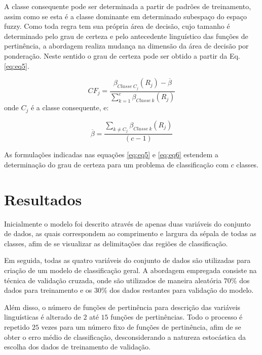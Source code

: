 \documentclass[12pt,a4paper]{article}
\numberwithin{equation}{section}
\begin{document}
A classe consequente pode ser determinada a partir de padrões de treinamento, assim como se esta é a classe dominante em determinado subespaço do espaço fuzzy. Como toda regra tem sua própria área de decisão, cujo tamanho é determinado pelo grau de certeza e pelo antecedente linguístico das funções de pertinência, a abordagem realiza mudança na dimensão da área de decisão por ponderação. Neste sentido o grau de certeza pode ser obtido a partir da Eq. \eqref{eq:eq5}.

\begin{equation} \label{eq:eq5}
CF_{j}=\frac{\beta_{Classe~C_{j}}(R_{j})-\overline{\beta}}{\sum_{k=1}^{c}\beta_{Classe~k}(R_{j})}
\end{equation}
onde $C_{j}$ é a classe consequente, e:

\begin{equation} \label{eq:eq6}
\overline{\beta}=\frac{\sum_{k\neq C_{j}}\beta_{Classe~k}(R_{j})}{(c-1)}
\end{equation}

As formulações indicadas nas equações \eqref{eq:eq5} e \eqref{eq:eq6} estendem a determinação do grau de certeza para um problema de classificação com $c$ classes.

\section{Resultados}

Inicialmente o modelo foi descrito através de apenas duas variáveis do conjunto de dados, as quais correspondem ao comprimento e largura da sépala de todas as classes, afim de se visualizar as delimitações das regiões de classificação.

Em seguida, todas as quatro variáveis do conjunto de dados são utilizadas para criação de um modelo de classificação geral. A abordagem empregada consiste na técnica de validação cruzada, onde são utilizados de maneira aleatória $70\%$ dos dados para treinamento e os $30\%$ dos dados restantes para validação do modelo.

Além disso, o número de funções de pertinência para descrição das variáveis linguísticas é alterado de $2$ até $15$ funções de pertinências. Todo o processo é repetido $25$ vezes para um número fixo de funções de pertinência, afim de se obter o erro médio de classificação, desconsiderando a natureza estocástica da escolha dos dados de treinamento de validação.
\end{document}
